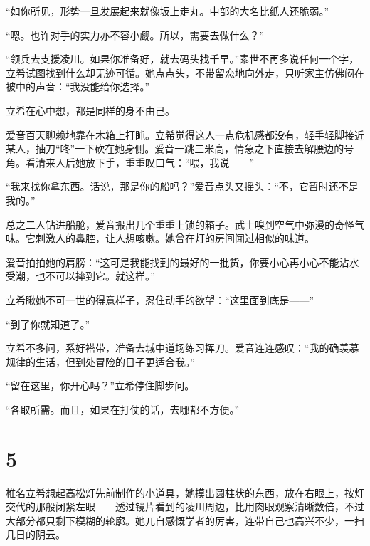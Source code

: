 \documentclass{article}
\begin{document}
“如你所见，形势一旦发展起来就像坂上走丸。中部的大名比纸人还脆弱。”



“嗯。也许对手的实力亦不容小觑。所以，需要去做什么？”



“领兵去支援凌川。如果你准备好，就去码头找千早。”素世不再多说任何一个字，立希试图找到什么却无迹可循。她点点头，不带留恋地向外走，只听家主仿佛闷在被中的声音：“我没能给你选择。”



立希在心中想，都是同样的身不由己。



爱音百天聊赖地靠在木箱上打盹。立希觉得这人一点危机感都没有，轻手轻脚接近某人，抽刀“咚”一下砍在她身侧。爱音一跳三米高，情急之下直接去解腰边的号角。看清来人后她放下手，重重叹口气：“喂，我说——”



“我来找你拿东西。话说，那是你的船吗？”爱音点头又摇头：“不，它暂时还不是我的。”



总之二人钻进船舱，爱音搬出几个重重上锁的箱子。武士嗅到空气中弥漫的奇怪气味。它刺激人的鼻腔，让人想咳嗽。她曾在灯的房间闻过相似的味道。



爱音拍拍她的肩膀：“这可是我能找到的最好的一批货，你要小心再小心不能沾水受潮，也不可以摔到它。就这样。”



立希瞅她不可一世的得意样子，忍住动手的欲望：“这里面到底是——”



“到了你就知道了。”



立希不多问，系好褡带，准备去城中道场练习挥刀。爱音连连感叹：“我的确羡慕规律的生话，但到处冒险的日子更适合我。”



“留在这里，你开心吗？”立希停住脚步问。



“各取所需。而且，如果在打仗的话，去哪都不方便。”





{\centering\section*{5}}





椎名立希想起高松灯先前制作的小道具，她摸出圆柱状的东西，放在右眼上，按灯交代的那般闭紧左眼——透过镜片看到的凌川周边，比用肉眼观察清晰数倍，不过大部分都只剩下模糊的轮廓。她兀自感慨学者的厉害，连带自己也高兴不少，一扫几日的阴云。
\end{document}
